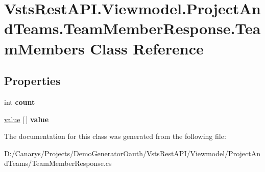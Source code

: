 \hypertarget{class_vsts_rest_a_p_i_1_1_viewmodel_1_1_project_and_teams_1_1_team_member_response_1_1_team_members}{}\section{Vsts\+Rest\+A\+P\+I.\+Viewmodel.\+Project\+And\+Teams.\+Team\+Member\+Response.\+Team\+Members Class Reference}
\label{class_vsts_rest_a_p_i_1_1_viewmodel_1_1_project_and_teams_1_1_team_member_response_1_1_team_members}
\subsection*{Properties}
\begin{DoxyCompactItemize}
\item 
\mbox{\label{class_vsts_rest_a_p_i_1_1_viewmodel_1_1_project_and_teams_1_1_team_member_response_1_1_team_members_ae22a38ce7738099aa3bfd61de9de6e87}} 
int {\bfseries count}
\item 
\mbox{\label{class_vsts_rest_a_p_i_1_1_viewmodel_1_1_project_and_teams_1_1_team_member_response_1_1_team_members_a8600625a39141b6ce5ee38176d7eb1d7}} 
\mbox{\hyperlink{class_vsts_rest_a_p_i_1_1_viewmodel_1_1_project_and_teams_1_1_team_member_response_1_1value}{value}} \mbox{[}$\,$\mbox{]} {\bfseries value}
\end{DoxyCompactItemize}


The documentation for this class was generated from the following file\+:\begin{DoxyCompactItemize}
\item 
D\+:/\+Canarys/\+Projects/\+Demo\+Generator\+Oauth/\+Vsts\+Rest\+A\+P\+I/\+Viewmodel/\+Project\+And\+Teams/Team\+Member\+Response.\+cs\end{DoxyCompactItemize}
